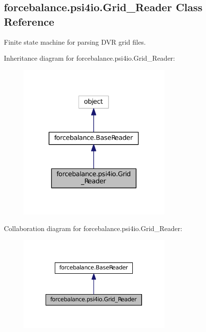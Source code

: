 \hypertarget{classforcebalance_1_1psi4io_1_1Grid__Reader}{\subsection{forcebalance.\-psi4io.\-Grid\-\_\-\-Reader Class Reference}
\label{classforcebalance_1_1psi4io_1_1Grid__Reader}
}


Finite state machine for parsing D\-V\-R grid files.  




Inheritance diagram for forcebalance.\-psi4io.\-Grid\-\_\-\-Reader\-:\nopagebreak
\begin{figure}[H]
\begin{center}
\leavevmode
\includegraphics[width=218pt]{classforcebalance_1_1psi4io_1_1Grid__Reader__inherit__graph}
\end{center}
\end{figure}


Collaboration diagram for forcebalance.\-psi4io.\-Grid\-\_\-\-Reader\-:\nopagebreak
\begin{figure}[H]
\begin{center}
\leavevmode
\includegraphics[width=218pt]{classforcebalance_1_1psi4io_1_1Grid__Reader__coll__graph}
\end{center}
\end{figure}
